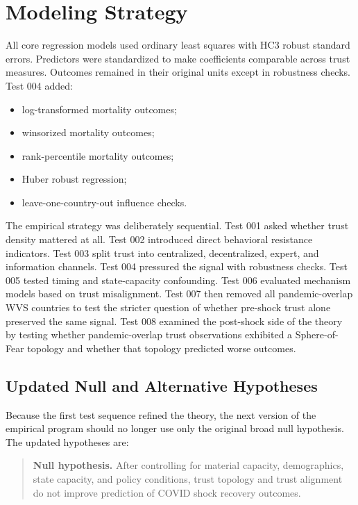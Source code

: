 \documentclass[12pt]{article}
\begin{document}
\section{Modeling Strategy}

All core regression models used ordinary least squares with HC3 robust standard errors. Predictors were standardized to make coefficients comparable across trust measures. Outcomes remained in their original units except in robustness checks. Test 004 added:

\begin{itemize}
  \item log-transformed mortality outcomes;
  \item winsorized mortality outcomes;
  \item rank-percentile mortality outcomes;
  \item Huber robust regression;
  \item leave-one-country-out influence checks.
\end{itemize}

The empirical strategy was deliberately sequential. Test 001 asked whether trust density mattered at all. Test 002 introduced direct behavioral resistance indicators. Test 003 split trust into centralized, decentralized, expert, and information channels. Test 004 pressured the signal with robustness checks. Test 005 tested timing and state-capacity confounding. Test 006 evaluated mechanism models based on trust misalignment. Test 007 then removed all pandemic-overlap WVS countries to test the stricter question of whether pre-shock trust alone preserved the same signal. Test 008 examined the post-shock side of the theory by testing whether pandemic-overlap trust observations exhibited a Sphere-of-Fear topology and whether that topology predicted worse outcomes.

\subsection{Updated Null and Alternative Hypotheses}

Because the first test sequence refined the theory, the next version of the empirical program should no longer use only the original broad null hypothesis. The updated hypotheses are:

\begin{quote}
\textbf{Null hypothesis.} After controlling for material capacity, demographics, state capacity, and policy conditions, trust topology and trust alignment do not improve prediction of COVID shock recovery outcomes.
\end{quote}
\end{document}
